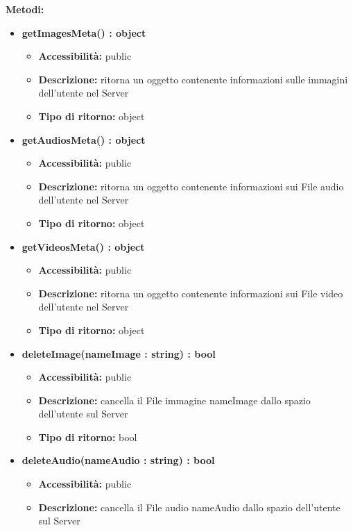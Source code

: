 {		\textbf{Metodi:}
			\begin{itemize}
			\item \textbf{getImagesMeta() : object}
				\begin{itemize}
				\item \textbf{Accessibilit\`{a}:} public
				\item \textbf{Descrizione:} ritorna un oggetto contenente informazioni sulle immagini dell'utente nel Server
				\item \textbf{Tipo di ritorno:} object
				\end{itemize}
			\item \textbf{getAudiosMeta() : object}
				\begin{itemize}
				\item \textbf{Accessibilit\`{a}:} public
				\item \textbf{Descrizione:} ritorna un oggetto contenente informazioni sui File audio dell'utente nel Server
				\item \textbf{Tipo di ritorno:} object
				\end{itemize}
			\item \textbf{getVideosMeta() : object}
				\begin{itemize}
				\item \textbf{Accessibilit\`{a}:} public
				\item \textbf{Descrizione:} ritorna un oggetto contenente informazioni sui File video dell'utente nel Server
				\item \textbf{Tipo di ritorno:} object
				\end{itemize}
			\item \textbf{deleteImage(nameImage : string) : bool}
				\begin{itemize}
				\item \textbf{Accessibilit\`{a}:} public
				\item \textbf{Descrizione:} cancella il File immagine nameImage dallo spazio dell'utente sul Server
				\item \textbf{Tipo di ritorno:} bool
				\end{itemize}
			\item \textbf{deleteAudio(nameAudio : string) : bool}
				\begin{itemize}
				\item \textbf{Accessibilit\`{a}:} public
				\item \textbf{Descrizione:} cancella il File audio nameAudio dallo spazio dell'utente sul Server

\end{itemize}
\end{itemize}}
